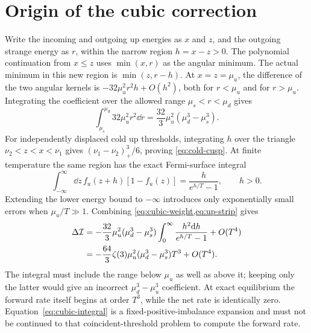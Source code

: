 \section{Origin of the cubic correction}
\label{app:cubic}
Write the incoming and outgoing up energies as \(x\) and \(z\), and the outgoing strange energy as \(r\), within the narrow region \(h=x-z>0\).
The polynomial continuation from \(x\leq z\) uses \(\min(x,r)\) as the angular minimum.
The actual minimum in this new region is \(\min(z,r-h)\).
At \(x=z=\mu_u\), the difference of the two angular kernels is \(-32\mu_u^2r^2h+O(h^2)\), both for \(r<\mu_u\) and for \(r>\mu_u\).
Integrating the coefficient over the allowed range \(\mu_s<r<\mu_d\) gives
\begin{equation}
 \int_{\mu_s}^{\mu_d}32\mu_u^2r^2\dd r
 =\frac{32}{3}\mu_u^2(\mu_d^3-\mu_s^3).
 \label{eq:cubic-weight}
\end{equation}
For independently displaced cold up thresholds, integrating \(h\) over the triangle \(\nu_2<z<x<\nu_1\) gives \((\nu_1-\nu_2)_+^3/6\), proving \cref{eq:cold-cusp}.
At finite temperature the same region has the exact Fermi-surface integral
\begin{equation}
 \int_{-\infty}^{\infty}\dd z\,f_u(z+h)[1-f_u(z)]
 =\frac{h}{e^{h/T}-1},\qquad h>0.
 \label{eq:up-strip}
\end{equation}
Extending the lower energy bound to \(-\infty\) introduces only exponentially small errors when \(\mu_u/T\gg1\).
Combining \cref{eq:cubic-weight,eq:up-strip} gives
\begin{align}
 \Delta\mathcal I
 &=-\frac{32}{3}\mu_u^2(\mu_d^3-\mu_s^3)
 \int_0^\infty\frac{h^2\mathrm d h}{e^{h/T}-1}+O(T^4)\notag\\
 &=-\frac{64}{3}\zeta(3)\mu_u^2(\mu_d^3-\mu_s^3)T^3+O(T^4).
 \label{eq:cubic-integral}
\end{align}
The integral must include the range below \(\mu_u\) as well as above it; keeping only the latter would give an incorrect \(\mu_d^3-\mu_u^3\) coefficient.
At exact equilibrium the forward rate itself begins at order \(T^3\), while the net rate is identically zero.
Equation~\eqref{eq:cubic-integral} is a fixed-positive-imbalance expansion and must not be continued to that coincident-threshold problem to compute the forward rate.

